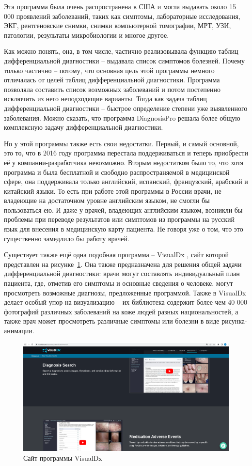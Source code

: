 Эта программа была очень распространена в США и могла выдавать около 15 000 проявлений заболеваний, таких как симптомы, лабораторные исследования, ЭКГ, рентгеновские снимки, снимки компьютерной томографии, МРТ, УЗИ, патологии, результаты микробиологии и многое другое. 

Как можно понять, она, в том числе, частично реализовывала функцию таблиц дифференциальной диагностики -- выдавала список симптомов болезней. Почему только частично -- потому, что основная цель этой программы немного отличалась от целей таблиц дифференциальной диагностики. Программа позволяла составить список возможных заболеваний и потом постепенно исключить из него неподходящие варианты. Тогда как задача таблиц дифференциальной диагностики -- быстрое определение степени уже выявленного заболевания. Можно сказать, что программа DiagnosisPro решала более общую комплексную задачу дифференциальной диагностики. 

Но у этой программы также есть свои недостатки. Первый, и самый основной, это то, что в 2016 году программа перестала поддерживаться и теперь приобрести её у компании-разработчика невозможно. Вторым недостатком было то, что хотя программа и была бесплатной и свободно распространяемой в медицинской сфере, она поддерживала только английский, испанский, французский, арабский и китайский языки. То есть при работе этой программы в России врачи, не владеющие на достаточном уровне английским языком, не смогли бы пользоваться ею. И даже у врачей, владеющих английским языком, возникли бы проблемы при переводе результатов или симптомов из программы на русский язык для внесения в медицинскую карту пациента. Не говоря уже о том, что это существенно замедлило бы работу врачей.

Существует также ещё одна подобная программа -- VisualDx \cite{visualdx}, сайт которой представлен на рисунке~\ref{fig:vdx}. Она также предназначена для решения общей задачи дифференциальной диагностики: врачи могут составлять индивидуальный план пациента, где, отметив его симптомы и основные сведения о человеке, могут просмотреть возможные диагнозы, предложенные программой. Также в VisualDx делает особый упор на визуализацию -- их библиотека содержит более чем 40 000 фотографий различных заболеваний на коже людей разных национальностей, а также врач может просмотреть различные симптомы или болезни в виде рисунка-анимации.

\begin{figure}
  \includegraphics[scale=0.3]{src/VisDx.png}
  \caption{Сайт программы VisualDx}
  \label{fig:vdx}
\end{figure}

